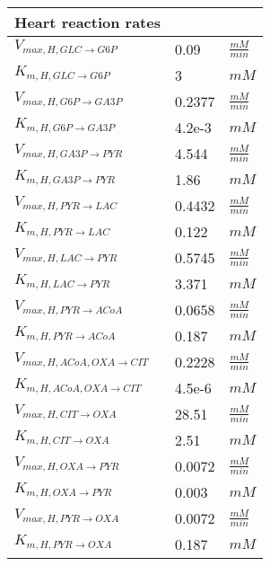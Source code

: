 \begin{supertabular}{lll}
\textbf{Heart reaction rates} \\ \hline
$V_{max, H,GLC \xrightarrow[]{} G6P}$ & 0.09 & $\frac{mM}{min}$       \\ \hline
$K_{m, H,GLC \xrightarrow[]{} G6P}$ & 3 & $mM$   \\ 

$V_{max, H,G6P \xrightarrow[]{} GA3P}$ & 0.2377 & $\frac{mM}{min}$       \\ \hline
$K_{m, H,G6P \xrightarrow[]{} GA3P}$ & 4.2e-3 & $mM$   \\ \hline

$V_{max, H,GA3P \xrightarrow[]{} PYR}$ & 4.544 & $\frac{mM}{min}$       \\ \hline
$K_{m, H,GA3P \xrightarrow[]{} PYR}$ & 1.86 & $mM$   \\ \hline

$V_{max, H,PYR \xrightarrow[]{} LAC}$ & 0.4432 & $\frac{mM}{min}$       \\ \hline
$K_{m, H,PYR \xrightarrow[]{} LAC}$ & 0.122 & $mM$   \\ \hline

$V_{max, H,LAC \xrightarrow[]{} PYR}$ & 0.5745 & $\frac{mM}{min}$       \\ \hline
$K_{m, H,LAC \xrightarrow[]{} PYR}$ & 3.371 & $mM$   \\ \hline

$V_{max, H,PYR \xrightarrow[]{} ACoA}$ & 0.0658  & $\frac{mM}{min}$       \\ \hline
$K_{m, H,PYR \xrightarrow[]{} ACoA}$ & 0.187 & $mM$   \\ \hline

$V_{max, H,ACoA , OXA \xrightarrow[]{} CIT}$ & 0.2228 & $\frac{mM}{min}$       \\ \hline
$K_{m, H,ACoA , OXA \xrightarrow[]{} CIT}$ & 4.5e-6  & $mM$   \\ \hline

$V_{max, H,CIT \xrightarrow[]{} OXA}$ & 28.51 & $\frac{mM}{min}$       \\ \hline
$K_{m, H,CIT \xrightarrow[]{} OXA}$ & 2.51 & $mM$   \\ \hline

$V_{max, H,OXA \xrightarrow[]{} PYR}$ & 0.0072 & $\frac{mM}{min}$       \\ \hline
$K_{m, H,OXA \xrightarrow[]{} PYR}$ & 0.003 & $mM$   \\ \hline

$V_{max, H,PYR \xrightarrow[]{} OXA}$ & 0.0072 & $\frac{mM}{min}$       \\ \hline
$K_{m, H,PYR \xrightarrow[]{} OXA}$ & 0.187 & $mM$   \\ \hline


\end{supertabular}
